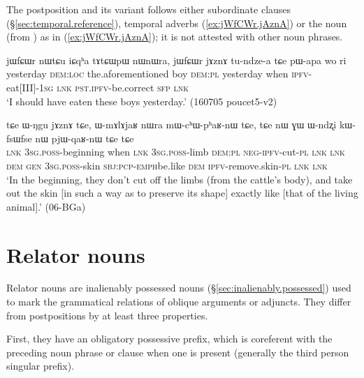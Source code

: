The postposition  and its variant  follows either subordinate clauses (§\ref{sec:temporal.reference}), temporal adverbs (\ref{ex:jWfCWr.jAznA}) or the noun  (from ) as in (\ref{ex:jWfCWr.jAznA}); it is not attested with other noun phrases.

\begin{exe}
\ex \label{ex:jWfCWr.jAznA}
\gll  jɯfɕɯr nɯtɕu iɕqʰa tɤtɕɯpɯ nɯnɯra, jɯfɕɯr jɤznɤ tu-ndze-a tɕe pɯ-apa wo ri \\ 
yesterday \textsc{dem}:\textsc{loc} the.aforementioned boy \textsc{dem}:\textsc{pl} yesterday when \textsc{ipfv}-eat[III]-\textsc{1sg}  \textsc{lnk} \textsc{pst}.\textsc{ipfv}-be.correct \textsc{sfp} \textsc{lnk} \\
\glt  `I should have eaten these boys yesterday.' (160705 poucet5-v2)
\end{exe}

 \begin{exe}
\ex \label{ex:WNgu.jAznA}
\gll  tɕe ɯ-ŋgu jɤznɤ tɕe, ɯ-mɤlɤjaʁ nɯra mɯ-cʰɯ-pʰaʁ-nɯ tɕe,  tɕe nɯ ɣɯ ɯ-ndʐi kɯ-fsɯ\redp{}fse nɯ pjɯ-qaʁ-nɯ tɕe tɕe \\
\textsc{lnk} \textsc{3sg}.\textsc{poss}-beginning when \textsc{lnk} \textsc{3sg}.\textsc{poss}-limb \textsc{dem}:\textsc{pl} \textsc{neg}-\textsc{ipfv}-cut-\textsc{pl} \textsc{lnk} \textsc{lnk} \textsc{dem} \textsc{gen} \textsc{3sg}.\textsc{poss}-skin \textsc{sbj}:\textsc{pcp}-\textsc{emph}\redp{}be.like \textsc{dem} \textsc{ipfv}-remove.skin-\textsc{pl} \textsc{lnk} \textsc{lnk} \\
\glt `In the beginning, they don't cut off the limbs (from the cattle's body), and take out the skin [in such a way as to preserve its shape] exactly like [that of the living animal].' (06-BGa) 
\end{exe}


 
\section{Relator nouns}  \label{sec:relator.nouns}  
 
Relator nouns are inalienably possessed nouns (§\ref{sec:inalienably.possessed}) used to mark the grammatical relations of oblique arguments or adjuncts. They differ from postpositions by at least three properties. 

First, they have an obligatory possessive prefix, which is coreferent with the preceding noun phrase or clause when one is present (generally the third person singular  prefix). 

